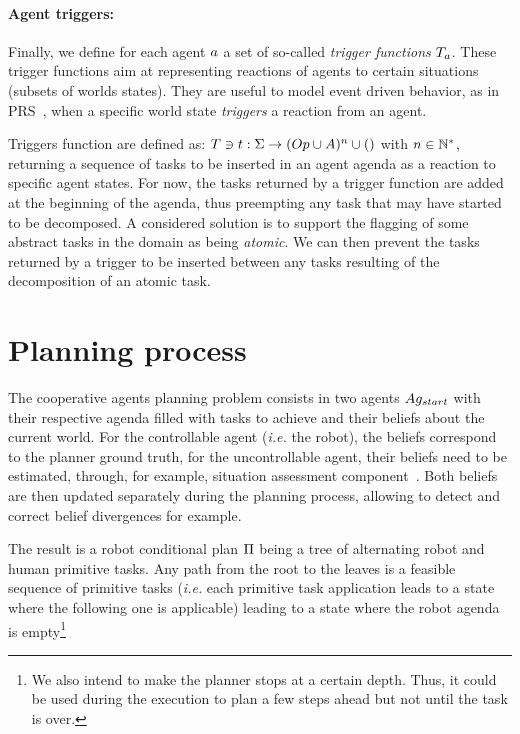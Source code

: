 \documentclass[a4paper,11pt,twoside]{StyleThese}
\begin{document}
\paragraph{\bf Agent triggers:}
Finally, we define for each agent $a$ a set of so-called \textit{trigger functions} $T_{a}$. These trigger functions aim at representing reactions of agents to certain situations (subsets of worlds states). They are useful to model event driven behavior, as in PRS~\cite{ingrand1996prs}, when a specific world state \textit{triggers} a reaction from an agent.

Triggers function are defined as: $T \ni t: \Sigma \rightarrow (Op \cup A)^n \cup ()$ with $n \in \mathbb{N}^*$, returning a sequence of tasks to be inserted in an agent agenda as a reaction to specific agent states. For now, the tasks returned by a trigger function are added at the beginning of the agenda, thus preempting any task that may have started to be decomposed. A considered solution is to support the flagging of some abstract tasks in the domain as being \textit{atomic}. We can then prevent the tasks returned by a trigger to be inserted between any tasks resulting of the decomposition of an atomic task.

\section{Planning process}
The cooperative agents planning problem consists in two agents $Ag_{start}$ with their respective agenda filled with tasks to achieve and their beliefs about the current world. For the controllable agent (\textit{i.e.} the robot), the beliefs correspond to the planner ground truth, for the uncontrollable agent, their beliefs need to be estimated, through, for example, situation assessment component~\cite{milliez2014framework, lemaignan2018underworlds}. Both beliefs are then updated separately during the planning process, allowing to detect and correct belief divergences for example. 

The result is a robot conditional plan $\Pi$ being a tree of alternating robot and human primitive tasks. Any path from the root to the leaves is a feasible sequence of primitive tasks (\textit{i.e.} each primitive task application leads to a state where the following one is applicable) leading to a state where the robot agenda is empty\footnote{We also intend to make the planner stops at a certain depth. Thus, it could be used during the execution to plan a few steps ahead but not until the task is over.}
\end{document}

